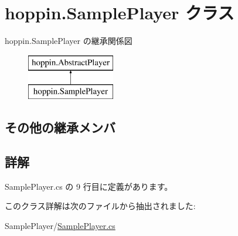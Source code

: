 \hypertarget{classhoppin_1_1_sample_player}{}\section{hoppin.\+Sample\+Player クラス}
\label{classhoppin_1_1_sample_player}
hoppin.\+Sample\+Player の継承関係図\begin{figure}[H]
\begin{center}
\leavevmode
\includegraphics[height=2.000000cm]{d7/dfe/classhoppin_1_1_sample_player}
\end{center}
\end{figure}
\subsection*{その他の継承メンバ}


\subsection{詳解}


 Sample\+Player.\+cs の 9 行目に定義があります。



このクラス詳解は次のファイルから抽出されました\+:\begin{DoxyCompactItemize}
\item 
Sample\+Player/\hyperlink{_sample_player_8cs}{Sample\+Player.\+cs}\end{DoxyCompactItemize}
